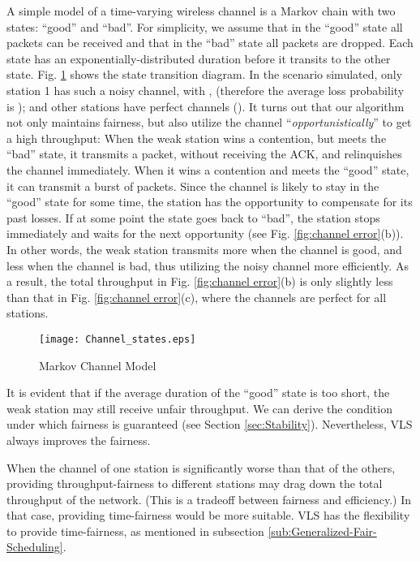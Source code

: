 \documentclass[letterpaper, 10 pt, conference]{ieeeconf}
\begin{document}
A simple model of a time-varying wireless channel is a Markov chain with two
states: {}``good'' and {}``bad''. For simplicity, we assume that
in the {}``good'' state all packets can be received and that in the {}``bad''
state all packets are dropped. Each state has an exponentially-distributed
duration before it transits to the other state. Fig. \ref{fig:Markov-Channel-Model}
shows the state transition diagram. In the scenario simulated, only
station 1 has such a noisy channel, with , 
(therefore the average loss probability is ); and other stations
have perfect channels (). It turns out that our algorithm not
only maintains fairness, but also utilize the channel {}``\emph{opportunistically}''
to get a high throughput: When the weak station wins a contention,
but meets the {}``bad'' state, it transmits a packet, without receiving
the ACK, and relinquishes the channel immediately. When it wins a
contention and meets the {}``good'' state, it can transmit a burst
of packets. Since the channel is likely to stay in the {}``good''
state for some time, the station has the opportunity to compensate
for its past losses. If at some point the state goes back to {}``bad'',
the station stops immediately and waits for the next opportunity (see
Fig. \ref{fig:channel error}(b)). In other words, the weak station transmits
more when the channel is good, and less when the channel is bad, thus utilizing
the noisy channel more efficiently. As a result, the total throughput
in Fig. \ref{fig:channel error}(b) is only slightly less than that
in Fig. \ref{fig:channel error}(c), where the channels are perfect
for all stations.

\begin{figure}
\noindent \begin{centering}
\texttt{[image: Channel\_states.eps]}
\par\end{centering}


\caption{\label{fig:Markov-Channel-Model}Markov Channel Model}
\end{figure}


It is evident that if the average duration of the {}``good'' state
is too short, the weak station may still receive unfair throughput.
We can derive the condition under which fairness is guaranteed (see
Section \ref{sec:Stability}). Nevertheless, VLS always improves the fairness.

When the channel of one station is significantly worse than that of the others,
providing throughput-fairness to different stations may drag down
the total throughput of the network. (This is a tradeoff between fairness
and efficiency.) In that case, providing time-fairness would be more
suitable. VLS has the flexibility to provide time-fairness, as mentioned
in subsection \ref{sub:Generalized-Fair-Scheduling}.
\end{document}

